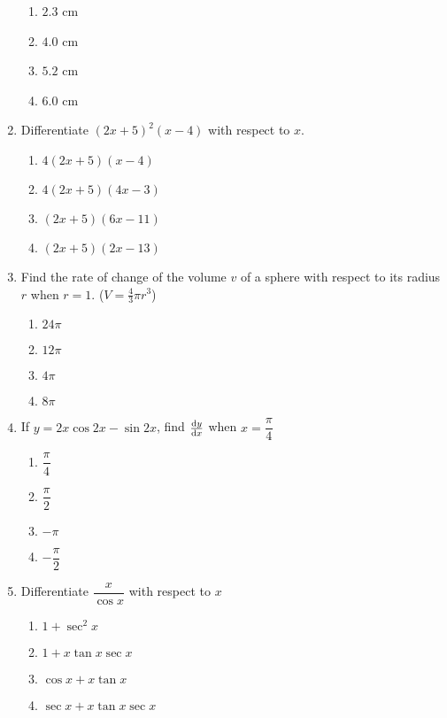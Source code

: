 \begin{multicols}{2}
\begin{enumerate}[label={\arabic*.}]
      \begin{enumerate}[label={\Alph*.}]
        \item \(2.3\) cm
        \item \(4.0\) cm
        \item \(5.2\) cm
        \item \(6.0\) cm
      \end{enumerate}
    \item Differentiate \({(2x+5)}^{2}(x-4)\) with respect to \(x\).
      \begin{enumerate}[label={\Alph*.}]
        \item \(4(2x+5)(x-4)\)
        \item \(4(2x+5)(4x-3)\)
        \item \((2x+5)(6x-11)\)
        \item \((2x+5)(2x-13)\)
      \end{enumerate}
    \item Find the rate of change of the volume \(v\) of a sphere with respect to its radius \(r\) when \(r = 1\). (\(V = \frac{4}{3}\pi r^3\))
      \begin{enumerate}[label={\Alph*.}]
        \item \(24\pi\)
        \item \(12\pi\)
        \item \(4\pi\)
        \item \(8\pi\)
      \end{enumerate}
    \item If \(y = 2x\cos{2x}-\sin{2x}\), find \(\frac{\mathrm{d}y}{\mathrm{d}x}\) when \(x = \dfrac{\pi}{4}\)
      \begin{enumerate}[label={\Alph*.}]
        \item \(\dfrac{\pi}{4}\)
        \item \(\dfrac{\pi}{2}\)
        \item \(-\pi\)
        \item \(-{\dfrac{\pi}{2}}\)
      \end{enumerate}
    \item Differentiate \(\dfrac{x}{\cos x}\) with respect to \(x\)
      \begin{enumerate}[label={\Alph*.}]
        \item \(1 + \sec^{2}x\)
        \item \(1 + x\tan x\sec x\)
        \item \(\cos x + x\tan x \)
        \item \(\sec x + x\tan x \sec x\)
      \end{enumerate}

\end{enumerate}
\end{multicols}
